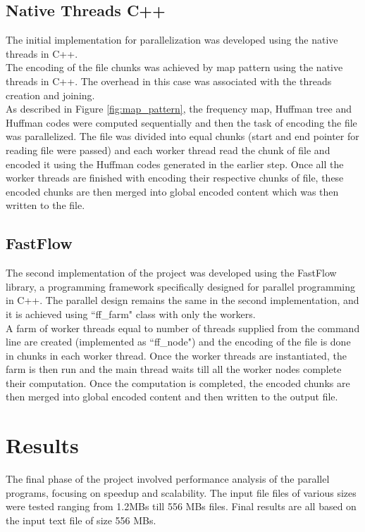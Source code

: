\documentclass[12pt, letterpaper]{article}  %
\begin{document}
\subsection{Native Threads C++}
The initial implementation for parallelization was developed using the native threads in C++. \\

The encoding of the file chunks was achieved by map pattern using the native threads in C++. The overhead in this case was associated with the threads creation and joining. \\

As described in Figure \ref{fig:map_pattern}, the frequency map, Huffman tree and Huffman codes were computed sequentially and then the task of encoding the file was parallelized. The file was divided into equal chunks (start and end pointer for reading file were passed) and each worker thread read the chunk of file and encoded it using the Huffman codes generated in the earlier step. Once all the worker threads are finished with encoding their respective chunks of file, these encoded chunks are then merged into global encoded content which was then written to the file.

\subsection{FastFlow}
The second implementation of the project was developed using the FastFlow library, a programming framework specifically designed for parallel programming in C++. The parallel design remains the same in the second implementation, and it is achieved using ``ff\_farm" class with only the workers. \\

A farm of worker threads equal to number of threads supplied from the command line are created (implemented as ``ff\_node") and the encoding of the file is done in chunks in each worker thread. Once the worker threads are instantiated, the farm is then run and the main thread waits till all the worker nodes complete their computation. Once the computation is completed, the encoded chunks are then merged into global encoded content and then written to the output file.

\section{Results}

The final phase of the project involved performance analysis of the parallel programs, focusing on speedup and scalability. The input file files of various sizes were tested ranging from 1.2MBs till 556 MBs files. Final results are all based on the input text file of size 556 MBs. \\
\end{document}
